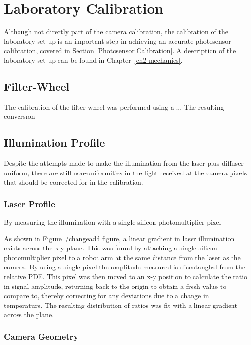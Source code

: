 \section{Laboratory Calibration}


Although not directly part of the camera calibration, the calibration of the laboratory set-up is an important step in achieving an accurate photosensor calibration, covered in Section \ref{Photosensor Calibration}. A description of the laboratory set-up can be found in Chapter~\ref{ch2-mechanics}.

\subsection{Filter-Wheel}

The calibration of the filter-wheel was performed using a ...
The resulting conversion 

\subsection{Illumination Profile}

Despite the attempts made to make the illumination from the laser plus diffuser uniform, there are still non-uniformities in the light received at the camera pixels that should be corrected for in the calibration.

\subsubsection{Laser Profile}

By measuring the illumination with a single silicon photomultiplier pixel

As shown in Figure~/change{add figure}, a linear gradient in laser illumination exists across the x-y plane. This was found by attaching a single silicon photomultiplier pixel to a robot arm at the same distance from the laser as the camera. By using a single pixel the amplitude measured is disentangled from the relative PDE. This pixel was then moved to an x-y position to calculate the ratio in signal amplitude, returning back to the origin to obtain a fresh value to compare to, thereby correcting for any deviations due to a change in temperature. The resulting distribution of ratios was fit with a linear gradient across the plane.

\subsubsection{Camera Geometry}

